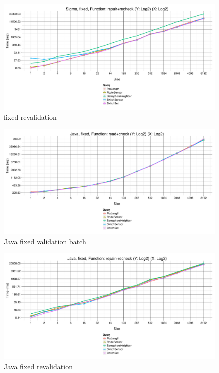 \begin{figure}[h!tb]
  \centering
  \includegraphics[width=\textwidth]{figures/fixed-Sigma-GroupBy-Query-time-revalidation.pdf}
  \caption{\SIGMA fixed revalidation}
  \label{fig:SigmaFixedReValidationBatch}
\end{figure}

\begin{figure}[h!tb]
  \centering
  \includegraphics[width=\textwidth]{figures/fixed-Java-GroupBy-Query-time-batch-validation.pdf}
  \caption{Java fixed validation batch}
  \label{fig:JavaFixedValidationBatch}
\end{figure}

\begin{figure}[h!tb]
  \centering
  \includegraphics[width=\textwidth]{figures/fixed-Java-GroupBy-Query-time-revalidation.pdf}
  \caption{Java fixed revalidation}
  \label{fig:JavaFixedReValidationBatch}
\end{figure}

\clearpage
